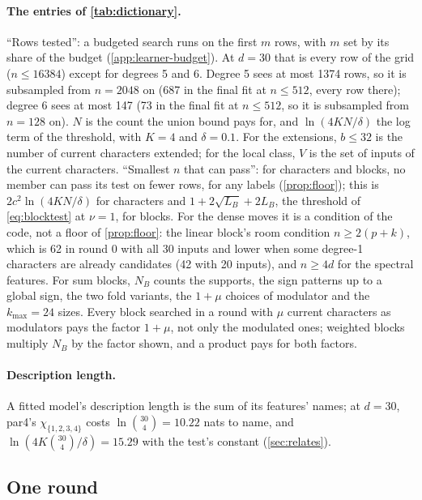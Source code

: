 \paragraph{The entries of \cref{tab:dictionary}.} ``Rows tested'': a budgeted search runs on the first $m$ rows, with $m$ set by its share of the budget (\cref{app:learner-budget}). At $d=30$ that is every row of the grid ($n\le16384$) except for degrees 5 and 6. Degree 5 sees at most 1374 rows, so it is subsampled from $n=2048$ on (687 in the final fit at $n\le512$, every row there); degree 6 sees at most 147 (73 in the final fit at $n\le512$, so it is subsampled from $n=128$ on). $N$ is the count the union bound pays for, and $\ln(4KN/\delta)$ the log term of the threshold, with $K=4$ and $\delta=0.1$. For the extensions, $b\le32$ is the number of current characters extended; for the local class, $V$ is the set of inputs of the current characters. ``Smallest $n$ that can pass'': for characters and blocks, no member can pass its test on fewer rows, for any labels (\cref{prop:floor}); this is $2c^2\ln(4KN/\delta)$ for characters and $1+2\sqrt{L_B}+2L_B$, the threshold of \cref{eq:blocktest} at $\nu=1$, for blocks. For the dense moves it is a condition of the code, not a floor of \cref{prop:floor}: the linear block's room condition $n\ge2(p+k)$, which is 62 in round 0 with all 30 inputs and lower when some degree-1 characters are already candidates (42 with 20 inputs), and $n\ge4d$ for the spectral features. For sum blocks, $N_B$ counts the supports, the sign patterns up to a global sign, the two fold variants, the $1+\mu$ choices of modulator and the $k_{\max}=24$ sizes. Every block searched in a round with $\mu$ current characters as modulators pays the factor $1+\mu$, not only the modulated ones; weighted blocks multiply $N_B$ by the factor shown, and a product pays for both factors.

\paragraph{Description length.} A fitted model's description length is the sum of its features' names; at $d=30$, par4's $\chi_{\{1,2,3,4\}}$ costs $\ln\binom{30}4=10.22$ nats to name, and $\ln(4K\binom{30}4/\delta)=15.29$ with the test's constant (\cref{sec:relates}).

\subsection{One round}\label{app:learner-round}

